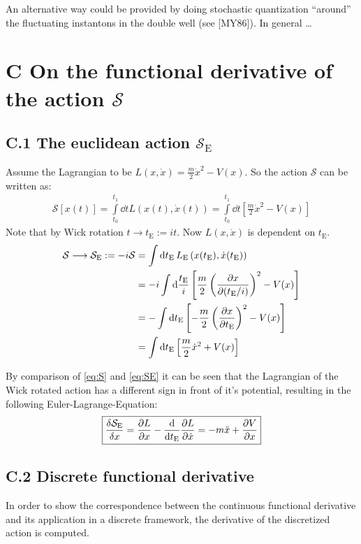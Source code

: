\documentclass[11pt,a4paper]{scrartcl}
\newcommand{\action}{\ensuremath{\mathcal{S}}}
\newcommand{\SE}{\ensuremath{\mathcal{S}_{\mathrm{E}}}}
\newcommand{\tE}{\ensuremath{t_{\mathrm{E}}}}
\begin{document}
An alternative way could be provided by doing stochastic quantization
\enquote{around} the fluctuating instantons in the double well (see [MY86]). In general \dots




\section*{C On the functional derivative of the action \action}
\subsection*{C.1 The euclidean action \SE}
\label{app:derivSE}
Assume the Lagrangian to be $L(x,\dot{x})=\frac{m}{2} \dot{x}^2-V(x)$. So the
action $\action$ can be written as:
\begin{align}
    \action\left[x(t)\right] = \int\limits_{t_0}^{t_1}\dd{t}L\left(x(t), \dot{x}(t)\right) = \int\limits_{t_0}^{t_1}\dd{t}\left[\frac{m}{2}\dot{x}^2-V(x)\right]\label{eq:S}
\end{align}
Note that by Wick rotation $t\longrightarrow \tE:=it$. Now $L(x,\dot{x})$ is
dependent on \tE.
\begin{align}
    \action\longrightarrow\SE:=-i\action
    &=\int\dd{\tE}L_\mathrm{E}\left(x(t_\mathrm{E}),
    \dot{x}(t_\mathrm{E})\right) \nonumber \\
    &=-i\int\dd\frac{\tE}{i}\left[\frac{m}{2}\left(\pdv{x}{(\tE/i)}\right)^2-V(x)\right]
    \nonumber \\
    &=-\int\dd\tE\left[-\frac{m}{2}\left(\pdv{x}{\tE}\right)^2-V(x)\right]
    \nonumber \\
    &=\int\dd\tE\left[\frac{m}{2}\dot{x}^2+V(x)\right] \label{eq:SE}
\end{align}

By comparison of \cref{eq:S} and \cref{eq:SE} it can be seen that the
Lagrangian of the Wick rotated action has a different sign in front of it's
potential, resulting in the following Euler-Lagrange-Equation:
\begin{equation}
    \boxed{%
        \fdv{\SE}{x}=\pdv{L}{x}-\dv{\tE}\pdv{L}{\dot{x}}=-m\ddot{x}+\pdv{V}{x}
    }
\end{equation}


\subsection*{C.2 Discrete functional derivative}
\label{app:deriv-discrete}
In order to show the correspondence between the continuous functional
derivative and its application in a discrete framework, the derivative of the
discretized action is computed.
\end{document}
